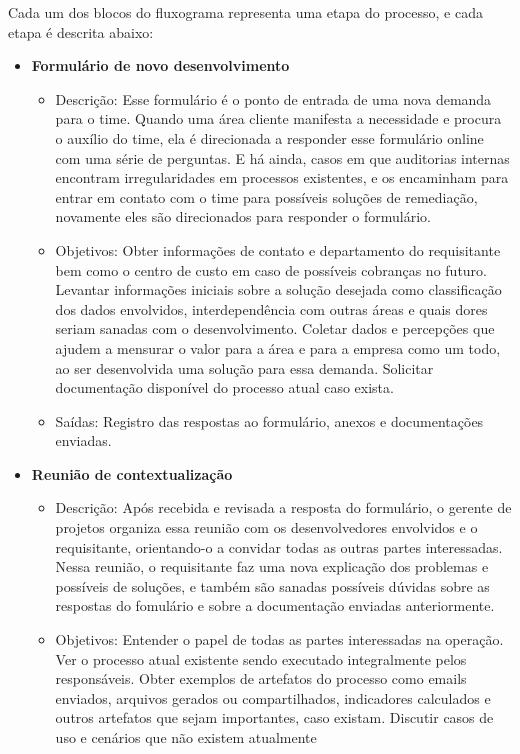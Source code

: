 	Cada um dos blocos do fluxograma representa uma etapa do processo, e cada etapa é descrita abaixo:
	\begin{itemize}
		\item \textbf{Formulário de novo desenvolvimento}
		\begin{itemize}
			\item Descrição: Esse formulário é o ponto de entrada de uma nova demanda para o time. Quando uma área
			cliente manifesta a necessidade e procura o auxílio do time, ela é direcionada a responder esse formulário
			online com uma série de perguntas. E há ainda, casos em que auditorias internas encontram irregularidades em processos existentes,
			e os encaminham para entrar em contato com o time para possíveis soluções de remediação, novamente eles são direcionados para responder o formulário.
			\item Objetivos: Obter informações de contato e departamento do requisitante bem como o centro de custo em caso de
			possíveis cobranças no futuro. Levantar informações iniciais sobre a solução desejada como classificação dos dados envolvidos, 
			interdependência com outras áreas e quais dores seriam sanadas com o desenvolvimento.
			Coletar dados e percepções que ajudem a mensurar o valor para a área e para a empresa como um todo, ao ser desenvolvida uma
			solução para essa demanda. Solicitar documentação disponível do processo atual caso exista.
			\item Saídas: Registro das respostas ao formulário, anexos e documentações enviadas.
		\end{itemize}
		\item \textbf{Reunião de contextualização}
		\begin{itemize}
			\item Descrição: Após recebida e revisada a resposta do formulário, o gerente de projetos organiza essa reunião com os desenvolvedores
			envolvidos e o requisitante, orientando-o a convidar todas as outras partes interessadas. Nessa reunião, o requisitante faz uma nova explicação dos problemas e possíveis
			de soluções, e também são sanadas possíveis dúvidas sobre as respostas do fomulário e sobre a documentação enviadas anteriormente.
			\item Objetivos: Entender o papel de todas as partes interessadas na operação. Ver o processo atual existente sendo executado integralmente
			pelos responsáveis. Obter exemplos de artefatos do processo como emails enviados, arquivos gerados ou compartilhados,
			indicadores calculados e outros artefatos que sejam importantes, caso existam. Discutir casos de uso e cenários que não existem atualmente

\end{itemize}
\end{itemize}
